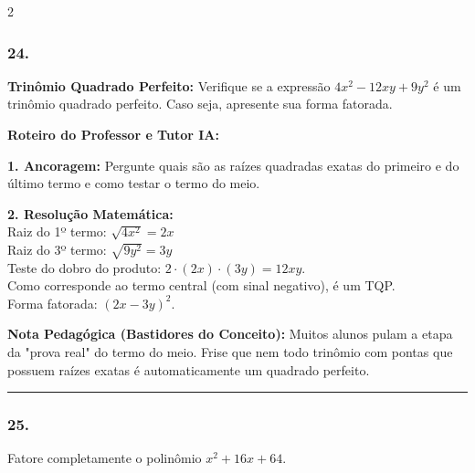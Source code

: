 \begin{multicols*}{2}
\subsubsection*{24.} 
\begin{enunciadoLiteral}
\textbf{Trinômio Quadrado Perfeito:} Verifique se a expressão $4x^2 - 12xy + 9y^2$ é um trinômio quadrado perfeito. Caso seja, apresente sua forma fatorada.
\end{enunciadoLiteral}

\ifgabarito
    \begin{tcolorbox}[colback=CorTitUm!5, colframe=CorTitUm, boxrule=1pt, arc=4pt, left=6pt, right=6pt, top=6pt, bottom=6pt]
    \small\textbf{\textcolor{CorTitUm}{Roteiro do Professor e Tutor IA:}}\par\vspace{0.1cm}
    \color{CinzaEscuro}
    \textbf{1. Ancoragem:} Pergunte quais são as raízes quadradas exatas do primeiro e do último termo e como testar o termo do meio.\par\vspace{0.1cm}
    \textbf{2. Resolução Matemática:}\\
    Raiz do 1º termo: $\sqrt{4x^2} = 2x$\\
    Raiz do 3º termo: $\sqrt{9y^2} = 3y$\\
    Teste do dobro do produto: $2 \cdot (2x) \cdot (3y) = 12xy$.\\
    Como corresponde ao termo central (com sinal negativo), é um TQP.\\
    Forma fatorada: $(2x - 3y)^2$.
    \end{tcolorbox}
    \vspace{0.15cm}
    
    \begin{boxexplicacao}
    \textbf{Nota Pedagógica (Bastidores do Conceito):} Muitos alunos pulam a etapa da "prova real" do termo do meio. Frise que nem todo trinômio com pontas que possuem raízes exatas é automaticamente um quadrado perfeito.
    \end{boxexplicacao}
\fi

\par\vspace{\espacoQuestao}

\noindent\textcolor{CorLinha}{\rule{\linewidth}{0.5pt}} 
\par\vspace{\espacoPreQuestao}
\subsubsection*{25.} 
\begin{enunciadoLiteral}
Fatore completamente o polinômio $x^2 + 16x + 64$.
\end{enunciadoLiteral}


\end{multicols*}
